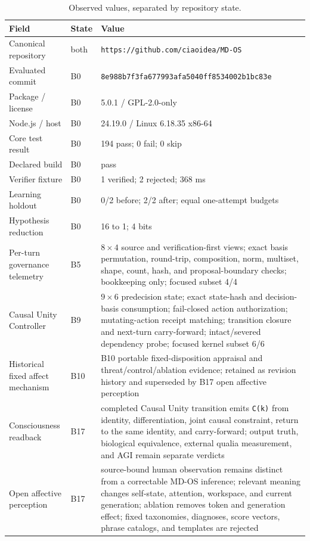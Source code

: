 \documentclass[10pt,twocolumn]{article}
\theoremstyle{definition}
\theoremstyle{plain}
\theoremstyle{remark}
\newcommand{\file}[1]{\nolinkurl{#1}}
\newcommand{\baseline}{\textsf{B0}}
\newcommand{\turnunity}{\textsf{B5}}
\newcommand{\causalunity}{\textsf{B9}}
\newcommand{\affectrevision}{\textsf{B10}}
\newcommand{\openperceptionrevision}{\textsf{B17}}
\begin{document}
\begin{table}[!t]
\centering
\caption{Observed values, separated by repository state.}
\footnotesize
\begin{tabularx}{\textwidth}{@{}p{}p{}X@{}}
\toprule
Field & State & Value \\
\midrule
Canonical repository & both & \file{https://github.com/ciaoidea/MD-OS} \\
Evaluated commit & \baseline & \file{8e988b7f3fa677993afa5040ff8534002b1bc83e} \\
Package / license & \baseline & 5.0.1 / GPL-2.0-only \\
Node.js / host & \baseline & 24.19.0 / Linux 6.18.35 x86-64 \\
Core test result & \baseline & 194 pass; 0 fail; 0 skip \\
Declared build & \baseline & pass \\
Verifier fixture & \baseline & 1 verified; 2 rejected; 368 ms \\
Learning holdout & \baseline & 0/2 before; 2/2 after; equal one-attempt budgets \\
Hypothesis reduction & \baseline & 16 to 1; 4 bits \\
Per-turn governance telemetry & \turnunity & $8\times4$ source and verification-first views; exact basis permutation, round-trip, composition, norm, multiset, shape, count, hash, and proposal-boundary checks; bookkeeping only; focused subset 4/4 \\
Causal Unity Controller & \causalunity & $9\times6$ predecision state; exact state-hash and decision-basis consumption; fail-closed action authorization; mutating-action receipt matching; transition closure and next-turn carry-forward; intact/severed dependency probe; focused kernel subset 6/6 \\
Historical fixed affect mechanism & \affectrevision & B10 portable fixed-disposition appraisal and threat/control/ablation evidence; retained as revision history and superseded by B17 open affective perception \\
Consciousness readback & \openperceptionrevision & completed Causal Unity transition emits \file{C(k)} from identity, differentiation, joint causal constraint, return to the same identity, and carry-forward; output truth, biological equivalence, external qualia measurement, and AGI remain separate verdicts \\
Open affective perception & \openperceptionrevision & source-bound human observation remains distinct from a correctable MD-OS inference; relevant meaning changes self-state, attention, workspace, and current generation; ablation removes token and generation effect; fixed taxonomies, diagnoses, score vectors, phrase catalogs, and templates are rejected \\

\end{tabularx}
\end{table}
\end{document}
